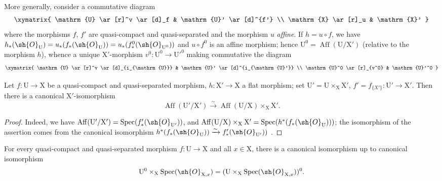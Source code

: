 More generally, consider a commutative diagram
\[
  \xymatrix{
    \mathrm{U} \ar[r]^v \ar[d]_f & \mathrm{U}' \ar[d]^{f'} \\
    \mathrm{X} \ar[r]_u & \mathrm{X}'
  }
\]
where the morphisms $f$, $f'$ are quasi-compact and quasi-separated and the morphism $u$ \emph{affine}.
If $h=u\circ f$, we have $h_*(\sh{O}_{\mathrm{U}})=u_*(f_*(\sh{O}_{\mathrm{U}}))=u_*(f_*^{0}(\sh{O}_{\mathrm{U}^0}))$ and $u\circ f^0$ is an affine morphism; hence $\mathrm{U}^0=\operatorname{Aff}(\mathrm{U}/\mathrm{X}')$ (relative to the morphism $h$), whence a unique $\mathrm{X}'$-morphism $v^0:\mathrm{U}^0\to\mathrm{U}'^0$ making commutative the diagram
\[
  \xymatrix{
    \mathrm{U} \ar[r]^v \ar[d]_{i_{\mathrm{U}}} & \mathrm{U}' \ar[d]^{i_{\mathrm{U}'}} \\
    \mathrm{U}^0 \ar[r]_{v^0} & \mathrm{U}'^0
  }
\]

\begin{proposition}[21.12.2]
\label{IV.21.12.2}
Let $f:\mathrm{U}\to\mathrm{X}$ be a quasi-compact and quasi-separated morphism, $h:\mathrm{X}'\to\mathrm{X}$ a flat morphism; set $\mathrm{U}'=\mathrm{U}\times_{\mathrm{X}}\mathrm{X}'$, $f'=f_{\{X'\}}:\mathrm{U}'\to\mathrm{X}'$.
Then there is a canonical $\mathrm{X}'$-isomorphism
\[
\label{IV.21.12.2.1}
  \operatorname{Aff}(\mathrm{U}'/\mathrm{X}')\xrightarrow{\sim}\operatorname{Aff}(\mathrm{U}/\mathrm{X})\times_{\mathrm{X}}\mathrm{X}'.
  \tag{21.12.2.1}
\]
\end{proposition}

\begin{proof}
Indeed, we have $\operatorname{Aff}(\mathrm{U}'/\mathrm{X}')=\operatorname{Spec}(f'_*(\sh{O}_{\mathrm{U}'}))$, and $\operatorname{Aff}(\mathrm{U}/\mathrm{X})\times_{\mathrm{X}}\mathrm{X}'=\operatorname{Spec}(h^*(f_*(\sh{O}_{\mathrm{U}})))$; the isomorphism of the assertion comes from the canonical isomorphism $h^*(f_*(\sh{O}_{\mathrm{U}}))\xrightarrow{\sim}f'_*(\sh{O}_{\mathrm{U}'}))$ .
\end{proof}

\begin{corollary}[21.12.3]
\label{IV.21.12.3}
For every quasi-compact and quasi-separated morphism $f:\mathrm{U}\to\mathrm{X}$ and all $x\in\mathrm{X}$, there is a canonical isomorphism up to canonical isomorphism
\[
  \mathrm{U}^0\times_{\mathrm{X}}\operatorname{Spec}(\sh{O}_{\mathrm{X},x})=(\mathrm{U}\times_{\mathrm{X}}\operatorname{Spec}(\sh{O}_{\mathrm{X},x}))^0.
\]
\end{corollary}

